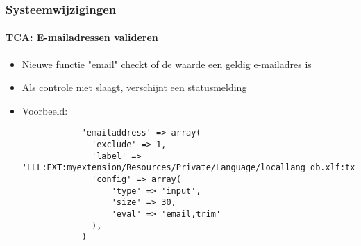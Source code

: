 \begin{frame}[fragile]
	\frametitle{Systeemwijzigingen}
	\framesubtitle{TCA: E-mailadressen valideren}

	\lstset{
		basicstyle=\tiny\ttfamily
	}

	\begin{itemize}

		\item Nieuwe functie "email" checkt of de waarde een geldig e-mailadres is
		\item Als controle niet slaagt, verschijnt een statusmelding
		\item Voorbeeld:

		\begin{lstlisting}
			'emailaddress' => array(
			  'exclude' => 1,
			  'label' => 'LLL:EXT:myextension/Resources/Private/Language/locallang_db.xlf:tx_myextension
		 	  'config' => array(
			      'type' => 'input',
			      'size' => 30,
			      'eval' => 'email,trim'
			  ),
			)
		\end{lstlisting}

	\end{itemize}

\end{frame}


